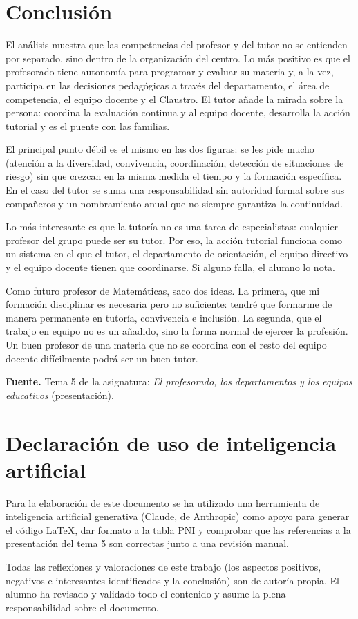 \documentclass[11pt,a4paper]{article}
\begin{document}
\section{Conclusión}

El análisis muestra que las competencias del profesor y del tutor no se
entienden por separado, sino dentro de la organización del centro. Lo más
positivo es que el profesorado tiene autonomía para programar y evaluar su
materia y, a la vez, participa en las decisiones pedagógicas a través del
departamento, el área de competencia, el equipo docente y el Claustro. El
tutor añade la mirada sobre la persona: coordina la evaluación continua y al
equipo docente, desarrolla la acción tutorial y es el puente con las familias.

El principal punto débil es el mismo en las dos figuras: se les pide mucho
(atención a la diversidad, convivencia, coordinación, detección de
situaciones de riesgo) sin que crezcan en la misma medida el tiempo y la
formación específica. En el caso del tutor se suma una responsabilidad sin
autoridad formal sobre sus compañeros y un nombramiento anual que no siempre
garantiza la continuidad.

Lo más interesante es que la tutoría no es una tarea de especialistas:
cualquier profesor del grupo puede ser su tutor. Por eso, la acción tutorial
funciona como un sistema en el que el tutor, el departamento de orientación,
el equipo directivo y el equipo docente tienen que coordinarse. Si alguno
falla, el alumno lo nota.

Como futuro profesor de Matemáticas, saco dos ideas. La primera, que mi
formación disciplinar es necesaria pero no suficiente: tendré que formarme de
manera permanente en tutoría, convivencia e inclusión. La segunda, que el
trabajo en equipo no es un añadido, sino la forma normal de ejercer la
profesión. Un buen profesor de una materia que no se coordina con el resto del
equipo docente difícilmente podrá ser un buen tutor.

\vspace{1em}
{\small\color{gris}\textbf{Fuente.} Tema 5 de la asignatura: \emph{El
profesorado, los departamentos y los equipos educativos} (presentación).}

\section*{Declaración de uso de inteligencia artificial}
Para la elaboración de este documento se ha utilizado una herramienta de
inteligencia artificial generativa (Claude, de Anthropic) como apoyo para
generar el código \LaTeX{}, dar formato a la tabla PNI y comprobar que las
referencias a la presentación del tema 5 son correctas junto a una revisión manual.

Todas las reflexiones y valoraciones de este trabajo (los aspectos positivos,
negativos e interesantes identificados y la conclusión) son de autoría propia.
El alumno ha revisado y validado todo el contenido y asume la plena
responsabilidad sobre el documento.
\end{document}
